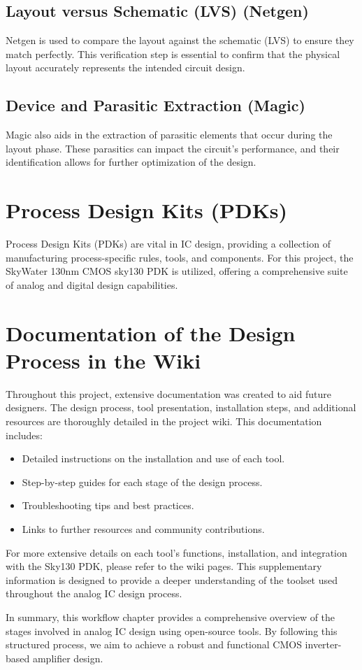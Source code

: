 \subsection{Layout versus Schematic (LVS) (Netgen)}

Netgen is used to compare the layout against the schematic (LVS) to ensure they match perfectly. This verification step is essential to confirm that the physical layout accurately represents the intended circuit design.

\subsection{Device and Parasitic Extraction (Magic)}

Magic also aids in the extraction of parasitic elements that occur during the layout phase. These parasitics can impact the circuit's performance, and their identification allows for further optimization of the design.

\section{Process Design Kits (PDKs)}

Process Design Kits (PDKs) are vital in IC design, providing a collection of manufacturing process-specific rules, tools, and components. For this project, the SkyWater 130nm CMOS sky130 PDK is utilized, offering a comprehensive suite of analog and digital design capabilities.

\section{Documentation of the Design Process in the Wiki}

Throughout this project, extensive documentation was created to aid future designers. The design process, tool presentation, installation steps, and additional resources are thoroughly detailed in the project wiki. This documentation includes:
\begin{itemize}
    \item Detailed instructions on the installation and use of each tool.
    \item Step-by-step guides for each stage of the design process.
    \item Troubleshooting tips and best practices.
    \item Links to further resources and community contributions.
\end{itemize}

For more extensive details on each tool's functions, installation, and integration with the Sky130 PDK, please refer to the wiki pages. This supplementary information is designed to provide a deeper understanding of the toolset used throughout the analog IC design process.

In summary, this workflow chapter provides a comprehensive overview of the stages involved in analog IC design using open-source tools. By following this structured process, we aim to achieve a robust and functional CMOS inverter-based amplifier design.
